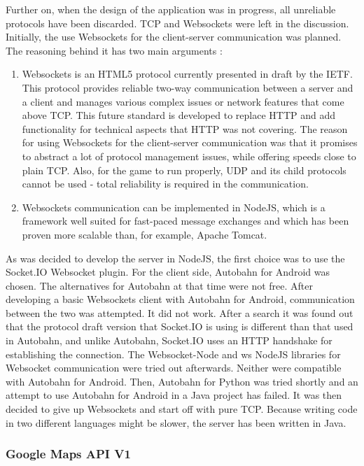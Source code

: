 Further on, when the design of the application was in progress, all unreliable
protocols have been discarded. TCP and Websockets were left in the discussion.
Initially, the use Websockets for the client-server communication was planned.
The reasoning behind it has two main arguments : 
\begin{enumerate}
  \item Websockets is an HTML5 protocol currently presented in draft by the
  IETF. This protocol provides reliable two-way communication between a server
  and a client and manages various complex issues or network features that come
  above TCP. This future standard is developed to replace HTTP and add
  functionality for technical aspects that HTTP was not covering. The reason for
  using Websockets for the client-server communication was that it promises to
  abstract a lot of protocol management issues, while offering speeds close to
  plain TCP. Also, for the game to run properly, UDP and its child protocols
  cannot be used - total reliability is required in the communication. 
  
  \item Websockets communication can be implemented in NodeJS, which is a
  framework well suited for fast-paced message exchanges and which has been
  proven more scalable than, for example, Apache Tomcat.
\end{enumerate}

As was decided to develop the server in NodeJS, the first choice was to use the
Socket.IO Websocket plugin. For the client side, Autobahn for Android was
chosen. The alternatives for Autobahn at that time were not free. After
developing a basic Websockets client with Autobahn for Android, communication
between the two was attempted. It did not work. After a search it was found out
that the protocol draft version that Socket.IO is using is different than that
used in Autobahn, and unlike Autobahn, Socket.IO uses an HTTP handshake for
establishing the connection. The Websocket-Node and ws NodeJS libraries for
Websocket communication were tried out afterwards. Neither were compatible with
Autobahn for Android. Then, Autobahn for Python was tried shortly and an
attempt to use Autobahn for Android in a Java project has failed. It was then
decided to give up Websockets and start off with pure TCP. Because writing code
in two different languages might be slower, the server has been written in Java.

\subsubsection{Google Maps API V1}

